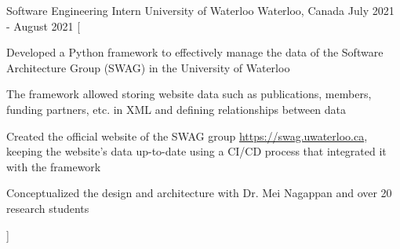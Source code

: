 \begin{cventries}
  \cventry
    {Software Engineering Intern} %
    {University of Waterloo} %
    {Waterloo, Canada} %
    {July 2021 - August 2021} %
    [
      \begin{cvitems} %
        \item {Developed a Python framework to effectively manage the data of the Software Architecture Group (SWAG) in the University of Waterloo}
        \item {The framework allowed storing website data such as publications, members, funding partners, etc. in XML and defining relationships between data}
        \item {Created the official website of the SWAG group \href{https://swag.uwaterloo.ca}{https://swag.uwaterloo.ca}, keeping the website's data up-to-date using a CI/CD process that integrated it with the framework}
        \item {Conceptualized the design and architecture with Dr. Mei Nagappan and over 20 research students}
      \end{cvitems}
    ]


\end{cventries}
